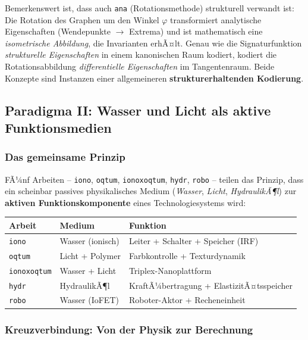 ﻿\documentclass[a4paper,12pt]{scrreprt}
\theoremstyle{definition}
\begin{document}
Bemerkenswert ist, dass auch \texttt{ana} (Rotationsmethode) strukturell
verwandt ist: Die Rotation des Graphen um den Winkel $\varphi$ transformiert
analytische Eigenschaften (Wendepunkte $\to$ Extrema) und ist mathematisch
eine \emph{isometrische Abbildung}, die Invarianten erhÃ¤lt. Genau wie die
Signaturfunktion \emph{strukturelle Eigenschaften} in einem kanonischen Raum
kodiert, kodiert die Rotationsabbildung \emph{differentielle Eigenschaften}
im Tangentenraum. Beide Konzepte sind Instanzen einer allgemeineren
\textbf{strukturerhaltenden Kodierung}.

\subsection{Paradigma II: Wasser und Licht als aktive Funktionsmedien}
\label{ssec:paradigma2}

\subsubsection{Das gemeinsame Prinzip}

FÃ¼nf Arbeiten -- \texttt{iono}, \texttt{oqtum}, \texttt{ionoxoqtum},
\texttt{hydr}, \texttt{robo} -- teilen das Prinzip, dass ein scheinbar
passives physikalisches Medium (\emph{Wasser}, \emph{Licht}, \emph{HydraulikÃ¶l})
zur \textbf{aktiven Funktionskomponente} eines Technologiesystems wird:

\begin{center}
\begin{tabular}{lll}
\toprule
\textbf{Arbeit} & \textbf{Medium} & \textbf{Funktion} \\
\midrule
\texttt{iono}       & Wasser (ionisch) & Leiter + Schalter + Speicher (IRF) \\
\texttt{oqtum}      & Licht + Polymer  & Farbkontrolle + Texturdynamik \\
\texttt{ionoxoqtum} & Wasser + Licht   & Tri\-plex-Nano\-plattform \\
\texttt{hydr}       & HydraulikÃ¶l      & KraftÃ¼bertragung + ElastizitÃ¤tsspeicher \\
\texttt{robo}       & Wasser (IoFET)   & Roboter-Aktor + Recheneinheit \\
\bottomrule
\end{tabular}
\end{center}

\subsubsection{Kreuzverbindung: Von der Physik zur Berechnung}
\end{document}

